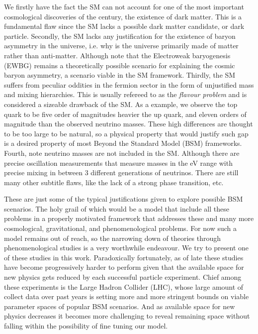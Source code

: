 We firstly have the fact the SM can not account for one of the most important cosmological discoveries of the century, the existence of dark matter. This is a fundamental flaw since the SM lacks a possible dark matter candidate, or dark particle. 
%
Secondly, the SM lacks any justification for the existence of baryon asymmetry in the universe, i.e. why is the universe primarily made of matter rather than anti-matter. 
%
Although note that the Electroweak baryogenesis (EWBG) remains a theoretically possible scenario for explaining the cosmic baryon asymmetry, a scenario viable in the SM framework.
%
Thirdly, the SM suffers from peculiar oddities in the fermion sector in the form of unjustified mass and mixing hierarchies. This is usually refereed to as the \textit{flavour problem} and is considered a sizeable drawback of the SM. 
%
As a example, we observe the top quark to be five order of magnitudes heavier the up quark, and eleven orders of magnitude than the observed neutrino masses. These high differences are thought to be too large to be natural, so a physical property that would justify such gap is a desired property of most Beyond the Standard Model (BSM) frameworks. 
%
Fourth, note neutrino masses are not included in the SM. Although there are precise oscillation measurements that measure masses in the eV range with precise mixing in between 3 different generations of neutrinos. 
%
There are still many other subtitle flaws, like the lack of a strong phase transition, etc. 

These are just some of the typical justifications given to explore possible BSM scenarios. The holy grail of which would be a model that include all these problems in a properly motivated framework that addresses these and many more cosmological, gravitational, and phenomenological problems.  
% 
For now such a model remains out of reach, so the narrowing down of theories through phenomenological studies is a very worthwhile endeavour. We try to present one of these studies in this work. %
%
Paradoxically fortunately, as of late these studies have become progressively harder to perform given that the available space for new physics gets reduced by each successful particle experiment. 
%
Chief among these experiments is the Large Hadron Collider (LHC), whose large amount of collect data over past years is setting more and more stringent bounds on viable parameter spaces of popular BSM scenarios. 
%
And as available space for new physics decreases it becomes more challenging to reveal remaining space without falling within the possibility of fine tuning our model.  

